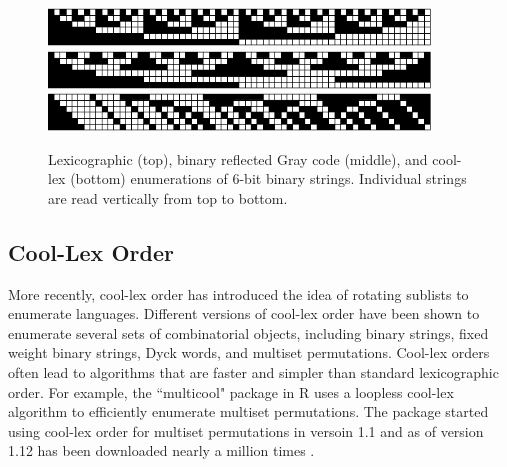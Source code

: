 \begin{figure}
\includegraphics[width=4in]{BLX6-cropped.pdf} 
\includegraphics[width=4in]{BRGC6-cropped.pdf} 
\includegraphics[width=4in]{BCLX6-cropped.pdf} 

    \caption{Lexicographic (top), binary reflected Gray code (middle), and cool-lex (bottom) enumerations of 6-bit binary strings. Individual strings are read vertically from top to bottom.}
    \label{binary}
\end{figure}

\subsection{Cool-Lex Order}
More recently, cool-lex order has introduced the idea of rotating sublists to enumerate languages.  Different versions of cool-lex order have been shown to enumerate several sets of combinatorial objects, including binary strings, fixed weight binary strings, Dyck words, and multiset permutations.  Cool-lex orders often lead to algorithms that are faster and simpler than standard lexicographic order.  For example, the ``multicool" package in R uses a loopless cool-lex algorithm to efficiently enumerate multiset permutations.   The package started using cool-lex order for multiset permutations in versoin 1.1 and as of version 1.12 has been downloaded nearly a million times \cite{multicool_2021}.



